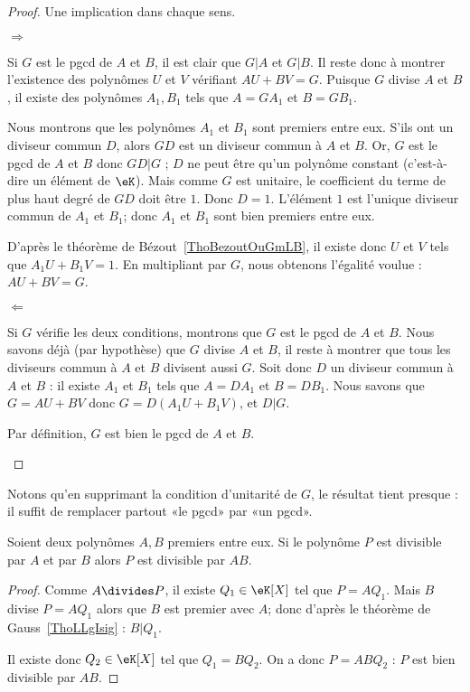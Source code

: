\begin{proof}
	Une implication dans chaque sens.

	\begin{subproof}
		\item[\( \Rightarrow\)]

		Si $G$ est le pgcd de $A$ et $B$, il est clair que $G|A$ et $G|B$.  Il reste donc à montrer l'existence des polynômes $U$ et $V$ vérifiant $AU+BV=G$. Puisque \( G\) divise \( A\) et \( B\), il existe des polynômes $A_1,B_1$ tels que $A=GA_1$ et $B=GB_1$.

		Nous montrons que les polynômes $A_1$ et $B_1$ sont premiers entre eux. S'ils ont un diviseur commun $D$, alors $GD$ est un diviseur commun à $A$ et $B$.  Or, $G$ est le pgcd de $A$ et $B$ donc $GD|G$ ; $D$ ne peut être qu'un polynôme constant (c'est-à-dire un élément de \( \eK\)). Mais comme \( G\) est unitaire, le coefficient du terme de plus haut degré de \( GD\) doit être \( 1\). Donc \( D=1\).  L'élément \( 1\) est l'unique diviseur commun de \( A_1\) et \( B_1\); donc $A_1$ et $B_1$ sont bien premiers entre eux.

		D'après le théorème de Bézout~\ref{ThoBezoutOuGmLB}, il existe donc $U$ et $V$ tels que $A_1U+B_1V=1$. En multipliant par $G$, nous obtenons l'égalité voulue : $AU+BV=G$.

		\item[\( \Leftarrow\)]

		Si $G$ vérifie les deux conditions, montrons que $G$ est le pgcd de $A$ et $B$. Nous savons déjà (par hypothèse) que $G$ divise $A$ et $B$, il reste à montrer que tous les diviseurs commun à $A$ et $B$ divisent aussi $G$. Soit donc $D$ un diviseur commun à $A$ et $B$ : il existe $A_1$ et $B_1$ tels que $A=DA_1$ et $B=DB_1$. Nous savons que $G=AU+BV$ donc $G=D(A_1U+B_1V)$, et $D|G$.

		Par définition, $G$ est bien le pgcd de $A$ et $B$.
	\end{subproof}
\end{proof}
Notons qu'en supprimant la condition d'unitarité de \( G\), le résultat tient presque : il suffit de remplacer partout «le pgcd» par «un pgcd».

\begin{lemma}       \label{LEMooGNAMooXRpgBn}
	Soient deux polynômes $A,B$ premiers entre eux. Si le polynôme \( P\) est divisible par $A$ et par $B$ alors $P$ est divisible par $AB$.
\end{lemma}

\begin{proof}
	Comme \( A\divides P\), il existe \( Q_1\in \eK[X]\) tel que \( P=AQ_1\). Mais \( B\) divise \( P=AQ_1\) alors que \( B\) est premier avec \( A\); donc d'après le théorème de Gauss~\ref{ThoLLgIsig} : $B|Q_1$.

	Il existe donc $Q_2\in \eK[X]$ tel que $Q_1=BQ_2$. On a donc $P=ABQ_2$ : $P$ est bien divisible par $AB$.
\end{proof}

